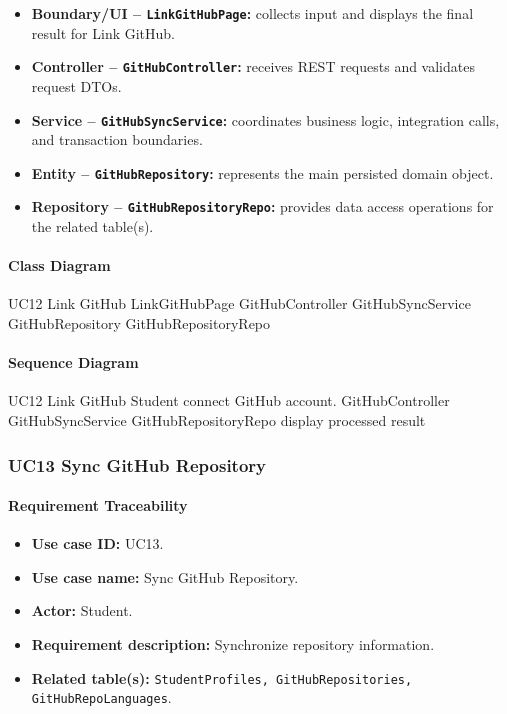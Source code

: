 \begin{itemize}
    \item \textbf{Boundary/UI -- \texttt{LinkGitHubPage}:} collects input and displays the final result for Link GitHub.
    \item \textbf{Controller -- \texttt{GitHubController}:} receives REST requests and validates request DTOs.
    \item \textbf{Service -- \texttt{GitHubSyncService}:} coordinates business logic, integration calls, and transaction boundaries.
    \item \textbf{Entity -- \texttt{GitHubRepository}:} represents the main persisted domain object.
    \item \textbf{Repository -- \texttt{GitHubRepositoryRepo}:} provides data access operations for the related table(s).
\end{itemize}

\paragraph{Class Diagram}

\ClassDiagram
{UC12 Link GitHub}
{LinkGitHubPage}
{GitHubController}
{GitHubSyncService}
{GitHubRepository}
{GitHubRepositoryRepo}

\paragraph{Sequence Diagram}

\SequenceDiagram
{UC12 Link GitHub}
{Student}
{connect GitHub account.}
{GitHubController}
{GitHubSyncService}
{GitHubRepositoryRepo}
{display processed result}

\subsubsection{UC13 Sync GitHub Repository}

\paragraph{Requirement Traceability}

\begin{itemize}
    \item \textbf{Use case ID:} UC13.
    \item \textbf{Use case name:} Sync GitHub Repository.
    \item \textbf{Actor:} Student.
    \item \textbf{Requirement description:} Synchronize repository information.
    \item \textbf{Related table(s):} \texttt{StudentProfiles, GitHubRepositories, GitHubRepoLanguages}.
\end{itemize}

